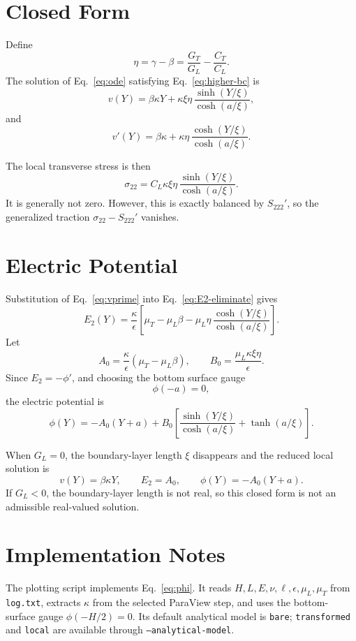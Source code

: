 \documentclass[11pt]{article}
\begin{document}
\section{Closed Form}

Define
\[
  \eta=\gamma-\beta=\frac{G_T}{G_L}-\frac{C_T}{C_L}.
\]
The solution of Eq.~\eqref{eq:ode} satisfying Eq.~\eqref{eq:higher-bc} is
\begin{equation}
  v(Y)=\beta\kappa Y
  +\kappa\xi\eta\,
  \frac{\sinh(Y/\xi)}{\cosh(a/\xi)} ,
  \label{eq:v}
\end{equation}
and
\begin{equation}
  v'(Y)=\beta\kappa
  +\kappa\eta\,
  \frac{\cosh(Y/\xi)}{\cosh(a/\xi)} .
  \label{eq:vprime}
\end{equation}

The local transverse stress is then
\[
  \sigma_{22}
  =C_L\kappa\xi\eta\,
  \frac{\sinh(Y/\xi)}{\cosh(a/\xi)} .
\]
It is generally not zero.  However, this is exactly balanced by \(S_{222}'\), so
the generalized traction \(\sigma_{22}-S_{222}'\) vanishes.

\section{Electric Potential}

Substitution of Eq.~\eqref{eq:vprime} into Eq.~\eqref{eq:E2-eliminate} gives
\begin{equation}
  E_2(Y)=
  \frac{\kappa}{\epsilon}
  \left[
    \mu_T-\mu_L\beta
    -\mu_L\eta\,
    \frac{\cosh(Y/\xi)}{\cosh(a/\xi)}
  \right].
  \label{eq:E2}
\end{equation}
Let
\[
  A_0=\frac{\kappa}{\epsilon}\left(\mu_T-\mu_L\beta\right),
  \qquad
  B_0=\frac{\mu_L\kappa\xi\eta}{\epsilon}.
\]
Since \(E_2=-\phi'\), and choosing the bottom surface gauge
\[
  \phi(-a)=0,
\]
the electric potential is
\begin{equation}
  \boxed{
  \phi(Y)=
  -A_0(Y+a)
  +B_0
  \left[
    \frac{\sinh(Y/\xi)}{\cosh(a/\xi)}
    +\tanh(a/\xi)
  \right]
  }.
  \label{eq:phi}
\end{equation}

When \(G_L=0\), the boundary-layer length \(\xi\) disappears and the reduced local
solution is
\[
  v(Y)=\beta\kappa Y,\qquad
  E_2=A_0,\qquad
  \phi(Y)=-A_0(Y+a).
\]
If \(G_L<0\), the boundary-layer length is not real, so this closed form is not an
admissible real-valued solution.

\section{Implementation Notes}

The plotting script implements Eq.~\eqref{eq:phi}.  It reads
\(H,L,E,\nu,\ell,\epsilon,\mu_L,\mu_T\) from \texttt{log.txt}, extracts
\(\kappa\) from the selected ParaView step, and uses the bottom-surface gauge
\(\phi(-H/2)=0\).  Its default analytical model is \texttt{bare};
\texttt{transformed} and \texttt{local} are available through
\texttt{--analytical-model}.
\end{document}
